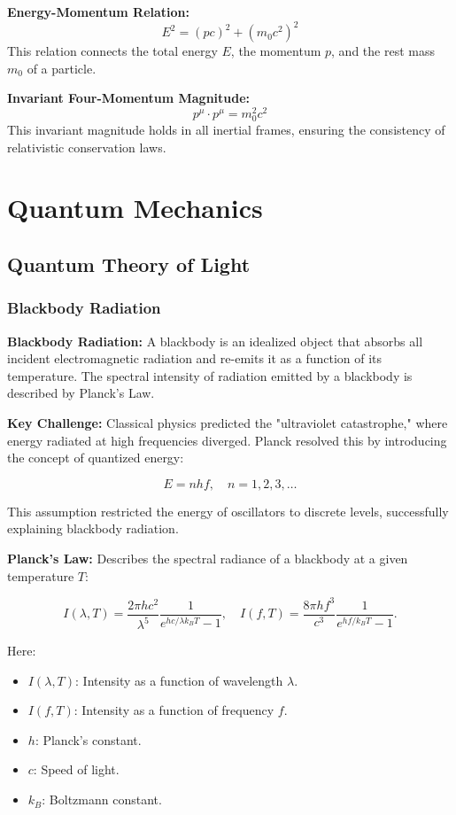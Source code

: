 \documentclass{article}
\newcommand{\eqbox}[1]{\begin{tcolorbox}[colback=gray!10] #1 \end{tcolorbox}}
\newcommand{\conceptbox}[1]{\begin{tcolorbox}[colback=blue!10] #1 \end{tcolorbox}}
\begin{document}
\eqbox{
\textbf{Energy-Momentum Relation:}
\[
E^2 = (pc)^2 + (m_0c^2)^2
\]
This relation connects the total energy \( E \), the momentum \( p \), and the rest mass \( m_0 \) of a particle.
}

\eqbox{
\textbf{Invariant Four-Momentum Magnitude:}
\[
p^\mu \cdot p^\mu = m_0^2 c^2
\]
This invariant magnitude holds in all inertial frames, ensuring the consistency of relativistic conservation laws.
}
\newpage
\section{Quantum Mechanics}

\subsection{Quantum Theory of Light}

\subsubsection{Blackbody Radiation}

\conceptbox{
\textbf{Blackbody Radiation:}
A blackbody is an idealized object that absorbs all incident electromagnetic radiation and re-emits it as a function of its temperature. The spectral intensity of radiation emitted by a blackbody is described by Planck's Law.
}

\conceptbox{
\textbf{Key Challenge:}
Classical physics predicted the "ultraviolet catastrophe," where energy radiated at high frequencies diverged. Planck resolved this by introducing the concept of quantized energy:
\eqbox{
\[
E = nhf, \quad n = 1, 2, 3, \dots
\]
}
This assumption restricted the energy of oscillators to discrete levels, successfully explaining blackbody radiation.
}

\conceptbox{
\textbf{Planck's Law:}
Describes the spectral radiance of a blackbody at a given temperature \( T \):
\eqbox{
\[
I(\lambda, T) = \frac{2\pi hc^2}{\lambda^5}\frac{1}{e^{hc/\lambda k_BT} - 1}, \quad I(f, T) = \frac{8 \pi h f^3}{c^3}\frac{1}{e^{hf/k_BT} - 1}.
\]
}
Here:
\begin{itemize}
    \item \( I(\lambda, T) \): Intensity as a function of wavelength \( \lambda \).
    \item \( I(f, T) \): Intensity as a function of frequency \( f \).
    \item \( h \): Planck's constant.
    \item \( c \): Speed of light.
    \item \( k_B \): Boltzmann constant.
\end{itemize}
}
\end{document}
